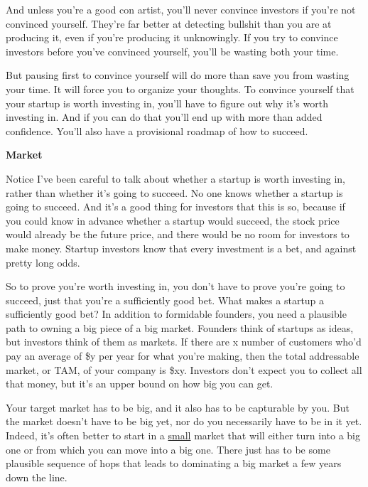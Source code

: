 \documentclass[12pt]{book}
\begin{document}
And unless you're a good con artist, you'll never convince investors if
you're not convinced yourself. They're far better at detecting bullshit
than you are at producing it, even if you're producing it unknowingly.
If you try to convince investors before you've convinced yourself,
you'll be wasting both your time.

But pausing first to convince yourself will do more than save you from
wasting your time. It will force you to organize your thoughts. To
convince yourself that your startup is worth investing in, you'll have
to figure out why it's worth investing in. And if you can do that you'll
end up with more than added confidence. You'll also have a provisional
roadmap of how to succeed.

\textbf{Market}

Notice I've been careful to talk about whether a startup is worth
investing in, rather than whether it's going to succeed. No one knows
whether a startup is going to succeed. And it's a good thing for
investors that this is so, because if you could know in advance whether
a startup would succeed, the stock price would already be the future
price, and there would be no room for investors to make money. Startup
investors know that every investment is a bet, and against pretty long
odds.

So to prove you're worth investing in, you don't have to prove you're
going to succeed, just that you're a sufficiently good bet. What makes a
startup a sufficiently good bet? In addition to formidable founders, you
need a plausible path to owning a big piece of a big market. Founders
think of startups as ideas, but investors think of them as markets. If
there are x number of customers who'd pay an average of \$y per year for
what you're making, then the total addressable market, or TAM, of your
company is \$xy. Investors don't expect you to collect all that money,
but it's an upper bound on how big you can get.

Your target market has to be big, and it also has to be capturable by
you. But the market doesn't have to be big yet, nor do you necessarily
have to be in it yet. Indeed, it's often better to start in a
\href{ds.html}{small} market that will either turn into a big one or
from which you can move into a big one. There just has to be some
plausible sequence of hops that leads to dominating a big market a few
years down the line.
\end{document}
